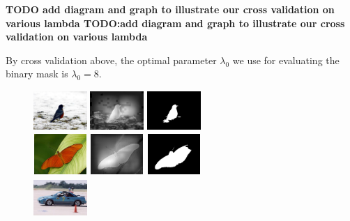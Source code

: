 \documentclass[10pt,twocolumn,letterpaper]{article}
\newcommand{\BOLD}{\textbf}
\begin{document}
\BOLD{TODO add diagram and graph to illustrate our cross validation on various lambda
TODO:add diagram and graph to illustrate our cross validation on various lambda}

By cross validation above, the optimal parameter $\lambda_0$ we use for evaluating the binary mask is $\lambda_0 = 8$.

\begin{figure}[h]
\begin{center}
    \includegraphics[width=0.8in,height=0.6in]{./Figures/CRFinference/5_159_159364.jpg}
    \includegraphics[width=0.8in,height=0.6in]{./Figures/CRFinference/5_159_159364_3.jpg}
    \includegraphics[width=0.8in,height=0.6in]{./Figures/CRFinference/5_159_159364_2.jpg} \\
    \includegraphics[width=0.8in,height=0.6in]{./Figures/CRFinference/5_159_159649.jpg}
    \includegraphics[width=0.8in,height=0.6in]{./Figures/CRFinference/5_159_159649_3.jpg}
    \includegraphics[width=0.8in,height=0.6in]{./Figures/CRFinference/5_159_159649_2.jpg} \\
    \includegraphics[width=0.8in,height=0.6in]{./Figures/CRFinference/5_162_162349.jpg}

\end{center}
\end{figure}
\end{document}
